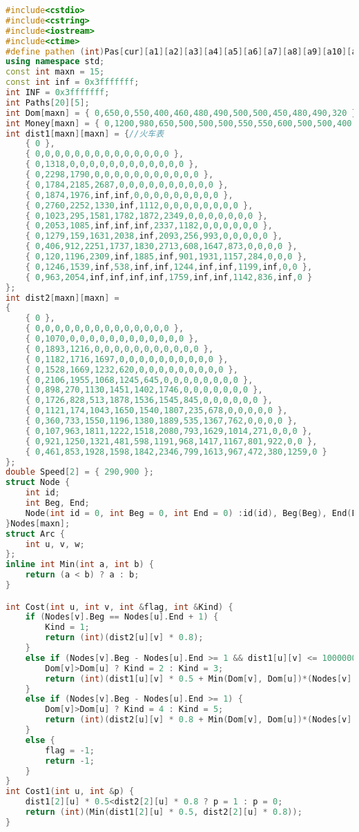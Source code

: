 \begin{lstlisting}[language=C++, numberstyle={\color{black!33}\tiny\sffamily}, basicstyle=\tiny]
#include<cstdio>
#include<cstring>
#include<iostream>
#include<ctime>
#define pathen (int)Pas[cur][a1][a2][a3][a4][a5][a6][a7][a8][a9][a10][a11][a12][a13]
using namespace std;
const int maxn = 15;
const int inf = 0x3fffffff;
int INF = 0x3fffffff;
int Paths[20][5];
int Dom[maxn] = { 0,650,0,550,400,460,480,490,500,500,450,480,490,320 };
int Money[maxn] = { 0,1200,980,650,500,500,500,550,550,600,500,500,400,650 };
int dist1[maxn][maxn] = {//火车表
	{ 0 },
	{ 0,0,0,0,0,0,0,0,0,0,0,0,0,0 },
	{ 0,1318,0,0,0,0,0,0,0,0,0,0,0,0 },
	{ 0,2298,1790,0,0,0,0,0,0,0,0,0,0,0 },
	{ 0,1784,2185,2687,0,0,0,0,0,0,0,0,0,0 },
	{ 0,1874,1976,inf,inf,0,0,0,0,0,0,0,0,0 },
	{ 0,2760,2252,1330,inf,1112,0,0,0,0,0,0,0,0 },
	{ 0,1023,295,1581,1782,1872,2349,0,0,0,0,0,0,0 },
	{ 0,2053,1085,inf,inf,inf,2337,1182,0,0,0,0,0,0 },
	{ 0,1279,159,1631,2038,inf,2093,256,993,0,0,0,0,0 },
	{ 0,406,912,2251,1737,1830,2713,608,1647,873,0,0,0,0 },
	{ 0,120,1196,2309,inf,1885,inf,901,1931,1157,284,0,0,0 },
	{ 0,1246,1539,inf,538,inf,inf,1244,inf,inf,1199,inf,0,0 },
	{ 0,963,2054,inf,inf,inf,inf,1759,inf,inf,1142,836,inf,0 }
};
int dist2[maxn][maxn] =
{
	{ 0 },
	{ 0,0,0,0,0,0,0,0,0,0,0,0,0,0 },
	{ 0,1070,0,0,0,0,0,0,0,0,0,0,0,0 },
	{ 0,1893,1216,0,0,0,0,0,0,0,0,0,0,0 },
	{ 0,1182,1716,1697,0,0,0,0,0,0,0,0,0,0 },
	{ 0,1528,1669,1232,620,0,0,0,0,0,0,0,0,0 },
	{ 0,2106,1955,1068,1245,645,0,0,0,0,0,0,0,0 },
	{ 0,898,270,1130,1451,1402,1746,0,0,0,0,0,0,0 },
	{ 0,1726,828,513,1878,1536,1545,845,0,0,0,0,0,0 },
	{ 0,1121,174,1043,1650,1540,1807,235,678,0,0,0,0,0 },
	{ 0,360,733,1550,1196,1380,1889,535,1367,762,0,0,0,0 },
	{ 0,107,963,1811,1222,1518,2080,793,1629,1014,271,0,0,0 },
	{ 0,921,1250,1321,481,598,1191,968,1417,1167,801,922,0,0 },
	{ 0,461,853,1928,1598,1842,2346,799,1613,967,472,380,1259,0 }
};
double Speed[2] = { 290,900 };
struct Node {
	int id;
	int Beg, End;
	Node(int id = 0, int Beg = 0, int End = 0) :id(id), Beg(Beg), End(End) {}
}Nodes[maxn];
struct Arc {
	int u, v, w;
};
inline int Min(int a, int b) {
	return (a < b) ? a : b;
}

int Cost(int u, int v, int &flag, int &Kind) {
	if (Nodes[v].Beg == Nodes[u].End + 1) {
		Kind = 1;
		return (int)(dist2[u][v] * 0.8);
	}
	else if (Nodes[v].Beg - Nodes[u].End >= 1 && dist1[u][v] <= 1000000) {
		Dom[v]>Dom[u] ? Kind = 2 : Kind = 3;
		return (int)(dist1[u][v] * 0.5 + Min(Dom[v], Dom[u])*(Nodes[v].Beg - Nodes[u].End - 1));
	}
	else if (Nodes[v].Beg - Nodes[u].End >= 1) {
		Dom[v]>Dom[u] ? Kind = 4 : Kind = 5;
		return (int)(dist2[u][v] * 0.8 + Min(Dom[v], Dom[u])*(Nodes[v].Beg - Nodes[u].End - 1));
	}
	else {
		flag = -1;
		return -1;
	}
}
int Cost1(int u, int &p) {
	dist1[2][u] * 0.5<dist2[2][u] * 0.8 ? p = 1 : p = 0;
	return (int)(Min(dist1[2][u] * 0.5, dist2[2][u] * 0.8));
}



\end{lstlisting}
